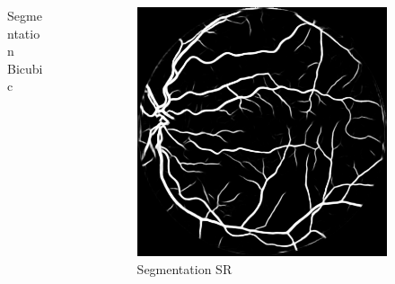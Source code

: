\documentclass{beamer}
\begin{document}
\begin{frame}
\begin{columns}
\begin{column}{0.33\linewidth}
\begin{figure}[htb]
        \caption*{Segmentation Bicubic}
      \end{figure}
    \end{column}
  \begin{column}{0.33\linewidth}
      \centering
      \begin{figure}[htb]
        \centering
        \includegraphics[width=1.0\textwidth]{segmentation_gan}
        \caption*{Segmentation SR}
      \end{figure}
    \end{column}
\end{columns}
\end{frame}
\end{document}
